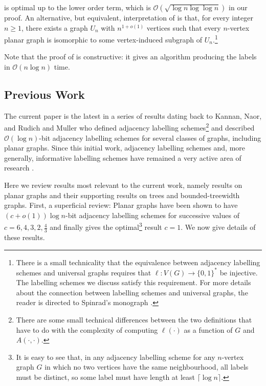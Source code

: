 \documentclass[10pt, conference, compsocconf]{IEEEtran}
\newcommand{\Oh}{\mathcal{O}}
\let\ge\geqslant
\begin{document}

 is optimal up to the lower order term,
which is $\Oh\left(\sqrt{\log n\log\log n}\right)$ in our proof.
An alternative, but equivalent, interpretation of  is that, for every integer $n\ge 1$, there exists a graph $U_n$ with $n^{1+o(1)}$  vertices such that every $n$-vertex planar graph is isomorphic to some vertex-induced subgraph of $U_n$.\footnote{There is a small technicality that the equivalence between adjacency labelling schemes and universal graphs requires that $\ell:V(G)\to\{0,1\}^*$ be injective.  The labelling schemes we discuss satisfy this requirement.  For more details about the connection between labelling schemes and universal graphs, the reader is directed to Spinrad's monograph \cite[Section~2.1]{spinrad:efficient}.}

Note that the proof of  is constructive: it gives an algorithm producing the labels in $\Oh(n\log n)$ time.

\subsection{Previous Work}

The current paper is the latest in a series of results dating back to Kannan, Naor, and Rudich \cite{kannan.naor.ea:implicit0,kannan.naor.ea:implicit} and Muller \cite{muller:local} who defined adjacency labelling schemes\footnote{There are some small technical differences between the two definitions that have to do with the complexity of computing $\ell(\cdot)$ as a function of $G$ and
$A(\cdot,\cdot)$.} and described $\Oh(\log n)$-bit adjacency labelling schemes for several classes of graphs, including planar graphs.  Since this initial work, adjacency labelling schemes and, more generally, informative labelling schemes have remained a very active area of research \cite{adjiashvili.rotbart:labeling,alstrup.kaplan.ea:adjacency,abrahamsen.alstrup.ea:near-optimal,alstrup.dahlgaard.ea:sublinear,alstrup.gortz.ea:distance,alstrup.gavoille.ea:simpler,alstrup.rauhe:improved,Alon17}.

Here we review results most relevant to the current work, namely results on planar graphs and their supporting results on trees and bounded-treewidth graphs.  First, a superficial review: Planar graphs have been shown to have $(c+o(1))\log n$-bit adjacency labelling schemes for successive values of $c=6,4,3,2,\tfrac{4}{3}$ and finally  gives the optimal\footnote{It is easy to see that, in any adjacency labelling scheme for any $n$-vertex graph $G$ in which no two vertices have the same neighbourhood, all labels must be distinct, so some label must have length at least $\lceil\log n\rceil$.} result $c=1$.  We now give details of these results.
\end{document}

